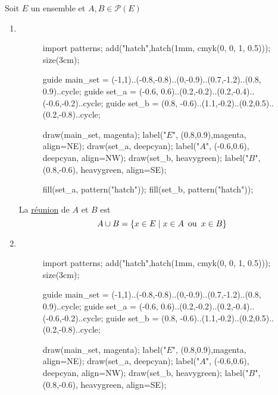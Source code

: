 \begin{defn}
	Soit $E$ un ensemble et $A, B \in \mathcal{P}(E)$
	\begin{enumerate}
		\item ~\\
			\begin{minipage}
				{\linewidth}
				\begin{wrapfigure}{l}{3cm}
					\centering
					\vspace{-7mm}
					\begin{asy}
						import patterns;
						add("hatch",hatch(1mm, cmyk(0, 0, 1, 0.5)));
						size(3cm);

						guide main_set = (-1,1)..(-0.8,-0.8)..(0,-0.9)..(0.7,-1.2)..(0.8, 0.9)..cycle;
						guide set_a = (-0.6, 0.6)..(0.2,-0.2)..(0.2,-0.4)..(-0.6,-0.2)..cycle;
						guide set_b = (0.8, -0.6)..(1.1,-0.2)..(0.2,0.5)..(0.2,-0.8)..cycle;

						draw(main_set, magenta); label("$E$", (0.8,0.9),magenta, align=NE);
						draw(set_a, deepcyan); label("$A$", (-0.6,0.6), deepcyan, align=NW);
						draw(set_b, heavygreen); label("$B$", (0.8,-0.6), heavygreen, align=SE);

						fill(set_a, pattern("hatch"));
						fill(set_b, pattern("hatch"));
					\end{asy}
				\end{wrapfigure}
				La \underline{réunion} de $A$ et $B$ est \[
					A \cup B = \{x \in E  \mid x \in A \operatorname{\text{ ou }} x \in B\}
				\]
			\end{minipage}
			\vspace{2cm}
		\item ~\\
			\begin{minipage}
				{\linewidth}
				\begin{wrapfigure}{l}{3cm}
					\centering
					\vspace{-7mm}
					\begin{asy}
						import patterns;
						add("hatch",hatch(1mm, cmyk(0, 0, 1, 0.5)));
						size(3cm);

						guide main_set = (-1,1)..(-0.8,-0.8)..(0,-0.9)..(0.7,-1.2)..(0.8, 0.9)..cycle;
						guide set_a = (-0.6, 0.6)..(0.2,-0.2)..(0.2,-0.4)..(-0.6,-0.2)..cycle;
						guide set_b = (0.8, -0.6)..(1.1,-0.2)..(0.2,0.5)..(0.2,-0.8)..cycle;

						draw(main_set, magenta); label("$E$", (0.8,0.9),magenta, align=NE);
						draw(set_a, deepcyan); label("$A$", (-0.6,0.6), deepcyan, align=NW);
						draw(set_b, heavygreen); label("$B$", (0.8,-0.6), heavygreen, align=SE);


\end{asy}
\end{wrapfigure}
\end{minipage}
\end{enumerate}
\end{defn}
